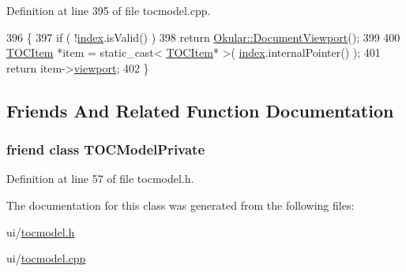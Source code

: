 Definition at line 395 of file tocmodel.\+cpp.


\begin{DoxyCode}
396 \{
397     \textcolor{keywordflow}{if} ( !\hyperlink{classTOCModel_a2ad29438ae7eb6c3085eeeb6cbe6d74d}{index}.isValid() )
398         \textcolor{keywordflow}{return} \hyperlink{classOkular_1_1DocumentViewport}{Okular::DocumentViewport}();
399 
400     \hyperlink{structTOCItem}{TOCItem} *item = \textcolor{keyword}{static\_cast<} \hyperlink{structTOCItem}{TOCItem}* \textcolor{keyword}{>}( \hyperlink{classTOCModel_a2ad29438ae7eb6c3085eeeb6cbe6d74d}{index}.internalPointer() );
401     \textcolor{keywordflow}{return} item->\hyperlink{structTOCItem_a4e72f01f6a8248cb770a35e16e33652a}{viewport};
402 \}
\end{DoxyCode}


\subsection{Friends And Related Function Documentation}
\hypertarget{classTOCModel_a180c7f8e6908c3834c91e6c7c1d8937b}{
\subsubsection[{T\+O\+C\+Model\+Private}]{\setlength{\rightskip}{0pt plus 5cm}friend class {\bf T\+O\+C\+Model\+Private}\hspace{0.3cm}{\ttfamily [friend]}}}\label{classTOCModel_a180c7f8e6908c3834c91e6c7c1d8937b}


Definition at line 57 of file tocmodel.\+h.



The documentation for this class was generated from the following files\+:\begin{DoxyCompactItemize}
\item 
ui/\hyperlink{tocmodel_8h}{tocmodel.\+h}\item 
ui/\hyperlink{tocmodel_8cpp}{tocmodel.\+cpp}\end{DoxyCompactItemize}
